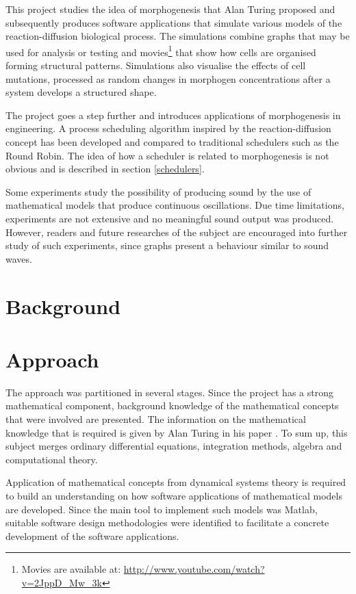     This project studies the idea of morphogenesis that Alan Turing proposed and subsequently produces software applications that simulate various models of the reaction-diffusion biological process. The simulations combine graphs that may be used for analysis or testing and movies\footnote{Movies are available at: \url{http://www.youtube.com/watch?v=2JppD_Mw_3k}} that show how cells are  organised forming structural patterns. Simulations also visualise the effects of cell mutations, processed as random changes in morphogen concentrations after a system develops a structured shape.

    The project goes a step further and introduces applications of morphogenesis in engineering. A process scheduling algorithm inspired by the reaction-diffusion concept has been developed and compared to traditional schedulers such as the Round Robin. The idea of how a scheduler is related to morphogenesis is not obvious and is described in section \ref{schedulers}.
	
    Some experiments study the possibility of producing sound by the use of mathematical models that produce continuous oscillations. Due time limitations, experiments are not extensive and no meaningful sound output was produced. However, readers and future researches of the subject are encouraged into further study of such experiments, since graphs present a behaviour similar to sound waves.  

	
    \section{Background}
    

	\section{Approach}

The approach was partitioned in several stages. Since the project has a strong mathematical component, background knowledge of the mathematical concepts that were involved are presented. The information on the mathematical knowledge that is required  is given by Alan Turing in his paper \cite{turing_chemical_1990}. To sum up, this subject merges ordinary differential equations, integration methods, algebra and computational theory.

Application of mathematical concepts from dynamical systems theory is required to build an understanding on how software applications of mathematical models are developed. Since the main tool to implement such models was Matlab, suitable software design methodologies were identified to facilitate a concrete development of the software applications.

